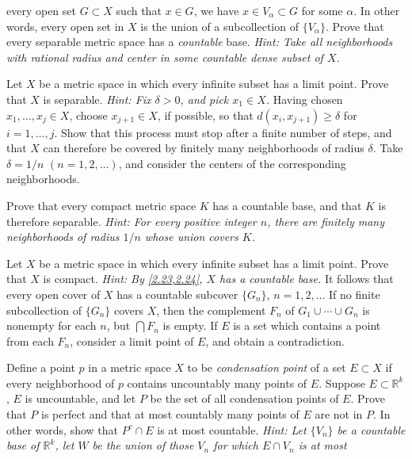 \begin{exercise}
  every open set \(G\subset X\) such that \(x\in G\), we have
  \(x\in V_{\alpha}\subset G\) for some \(\alpha\).
  In other words, every open set in \(X\) is the union of a subcollection of
  \(\{V_{\alpha}\}\).
  Prove that every separable metric space has a \textit{countable} base.
  \textit{Hint: Take all neighborhoods with rational radius and center in some
    countable dense subset of \(X\).}
\item
  \label{2.24}
  Let \(X\) be a metric space in which every infinite subset has a limit point.
  Prove that \(X\) is separable.
  \textit{Hint: Fix \(\delta > 0\), and pick \(x_1\in X\).}
  Having chosen \(x_1,\ldots,x_j\in X\), choose \(x_{j + 1}\in X\), if
  possible, so that \(d(x_i, x_{j + 1})\geq\delta\) for \(i = 1,\ldots,j\).
  Show that this process must stop after a finite number of steps, and that
  \(X\) can therefore be covered by finitely many neighborhoods of radius
  \(\delta\).
  Take \(\delta = 1/n\) \((n = 1,2,\ldots)\), and consider the centers of the
  corresponding neighborhoods.
\item
  Prove that every compact metric space \(K\) has a countable base, and that
  \(K\) is therefore separable.
  \textit{Hint: For every positive integer \(n\), there are finitely many
    neighborhoods of radius \(1/n\) whose union covers \(K\).}
\item
  Let \(X\) be a metric space in which every infinite subset has a limit point.
  Prove that \(X\) is compact.
  \textit{Hint: By \cref{2.23,2.24}, \(X\) has a countable base.}
  It follows that every open cover of \(X\) has a countable subcover
  \(\{G_n\}\), \(n = 1,2,\ldots\)
  If no finite subcollection of \(\{G_n\}\) covers \(X\), then the complement
  \(F_n\) of \(G_1\cup\cdots\cup G_n\) is nonempty for each \(n\), but
  \(\bigcap F_n\) is empty.
  If \(E\) is a set which contains a point from each \(F_n\), consider a limit
  point of \(E\), and obtain a contradiction.
\item
  \label{2.27}
  Define a point \(p\) in a metric space \(X\) to be
  \textit{condensation point} of a set \(E\subset X\) if every neighborhood of
  \(p\) contains uncountably many points of \(E\).
  Suppose \(E\subset\mathbb{R}^k\), \(E\) is uncountable, and let \(P\) be the
  set of all condensation points of \(E\).
  Prove that \(P\) is perfect and that at most countably many points of \(E\)
  are not in \(P\).
  In other words, show that \(P^c\cap E\) is at most countable.
  \textit{Hint: Let \(\{V_n\}\) be a countable base of \(\mathbb{R}^k\), let
    \(W\) be the union of those \(V_n\) for which \(E\cap V_n\) is at most
}
\end{exercise}
